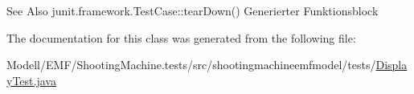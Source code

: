 \begin{DoxySeeAlso}{See Also}
junit.\-framework.\-Test\-Case\-::tear\-Down() Generierter Funktionsblock 
\end{DoxySeeAlso}


The documentation for this class was generated from the following file\-:\begin{DoxyCompactItemize}
\item 
Modell/\-E\-M\-F/\-Shooting\-Machine.\-tests/src/shootingmachineemfmodel/tests/\hyperlink{_display_test_8java}{Display\-Test.\-java}\end{DoxyCompactItemize}

